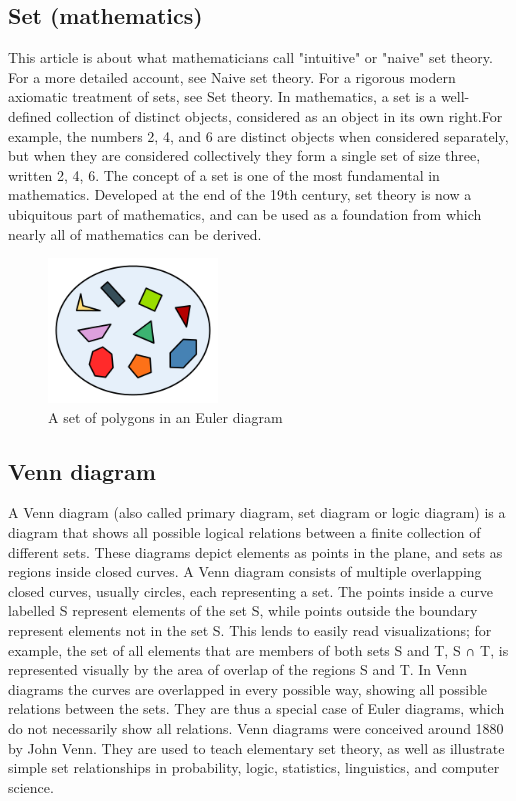 \documentclass{article}
\begin{document}
\subsection{Set (mathematics)}
This article is about what mathematicians call "intuitive" or "naive" set theory. For a more detailed account, see Naive set theory. For a rigorous modern axiomatic treatment of sets, see Set theory.
In mathematics, a set is a well-defined collection of distinct objects, considered as an object in its own right.For example, the numbers 2, 4, and 6 are distinct objects when considered separately, but when they are considered collectively they form a single set of size three, written {2, 4, 6}. The concept of a set is one of the most fundamental in mathematics. Developed at the end of the 19th century, set theory is now a ubiquitous part of mathematics, and can be used as a foundation from which nearly all of mathematics can be derived.
\begin{figure}[h]
\includegraphics[width=0.4\textwidth]{sn.png}
\caption{A set of polygons in an Euler diagram}
\end{figure}
\subsection{Venn diagram}
A Venn diagram (also called primary diagram, set diagram or logic diagram) is a diagram that shows all possible logical relations between a finite collection of different sets. These diagrams depict elements as points in the plane, and sets as regions inside closed curves. A Venn diagram consists of multiple overlapping closed curves, usually circles, each representing a set. The points inside a curve labelled S represent elements of the set S, while points outside the boundary represent elements not in the set S. This lends to easily read visualizations; for example, the set of all elements that are members of both sets S and T, S ∩ T, is represented visually by the area of overlap of the regions S and T. In Venn diagrams the curves are overlapped in every possible way, showing all possible relations between the sets. They are thus a special case of Euler diagrams, which do not necessarily show all relations. Venn diagrams were conceived around 1880 by John Venn. They are used to teach elementary set theory, as well as illustrate simple set relationships in probability, logic, statistics, linguistics, and computer science.
\end{document}

